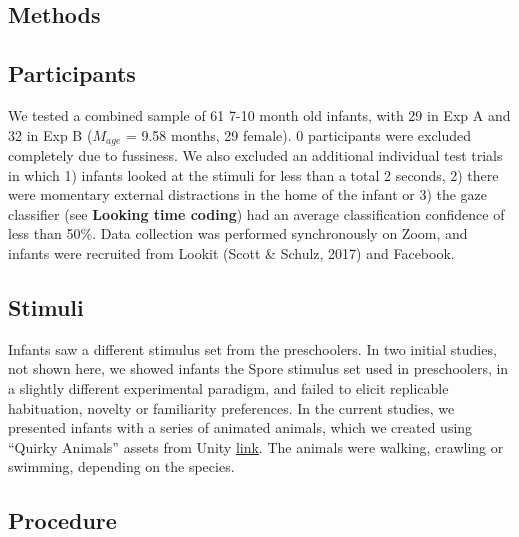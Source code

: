 \documentclass[10pt, letterpaper]{article}
\begin{document}
\hypertarget{methods-1}{%
\subsection{Methods}\label{methods-1}}

\hypertarget{participants-1}{%
\subsection{Participants}\label{participants-1}}

We tested a combined sample of 61 7-10 month old infants, with 29 in Exp
A and 32 in Exp B (\(M_{age}\) = 9.58 months, 29 female). 0 participants
were excluded completely due to fussiness. We also excluded an
additional individual test trials in which 1) infants looked at the
stimuli for less than a total 2 seconds, 2) there were momentary
external distractions in the home of the infant or 3) the gaze
classifier (see \textbf{Looking time coding}) had an average
classification confidence of less than 50\%. Data collection was
performed synchronously on Zoom, and infants were recruited from Lookit
(Scott \& Schulz, 2017) and Facebook.

\hypertarget{stimuli-1}{%
\subsection{Stimuli}\label{stimuli-1}}

Infants saw a different stimulus set from the preschoolers. In two
initial studies, not shown here, we showed infants the Spore stimulus
set used in preschoolers, in a slightly different experimental paradigm,
and failed to elicit replicable habituation, novelty or familiarity
preferences. In the current studies, we presented infants with a series
of animated animals, which we created using ``Quirky Animals'' assets
from Unity \href{https://tinyurl.com/469xxrn7}{link}. The animals were
walking, crawling or swimming, depending on the species.

\hypertarget{procedure}{%
\subsection{Procedure}\label{procedure}}
\end{document}
